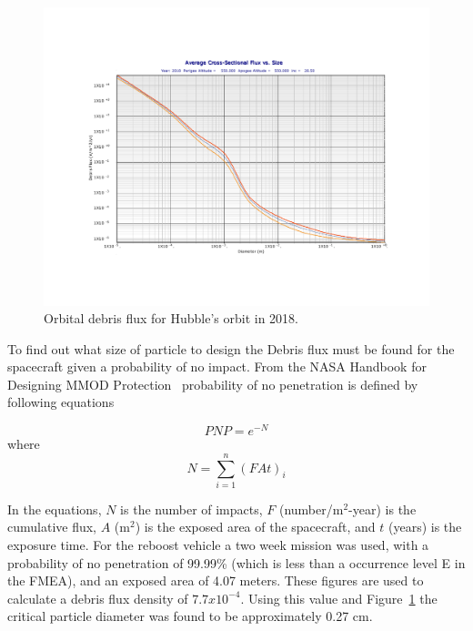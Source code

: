 \documentclass[paper=letter, fontsize=11pt]{scrartcl} %
\numberwithin{equation}{section} %
\numberwithin{figure}{section} %
\numberwithin{table}{section} %
\begin{document}
\begin{figure}[H]
    \begin{center}
        \includegraphics[width=5.5in]{hstOrbit.pdf}
        \caption{Orbital debris flux for Hubble's orbit in 2018.}
        \label{fig:hubbleOrbit}
    \end{center}
\end{figure}

To find out what size of particle to design the Debris flux must be found for the spacecraft given a probability of no impact. From the NASA Handbook for Designing MMOD Protection~\cite{handbook_mmod} probability of no penetration is defined by following equations

\begin{equation*}
    PNP = e^{-N}
\end{equation*}
where
\begin{equation*}
    N = \sum\limits_{i=1}^n (FAt)_i
\end{equation*}

In the equations, $N$ is the number of impacts, $F$ (number/m$^2$-year) is the cumulative flux, $A$ (m$^2$) is the exposed area of the spacecraft, and $t$ (years) is the exposure time. For the reboost vehicle a two week mission was used, with a probability of no penetration of 99.99\% (which is less than a occurrence level E in the FMEA), and an exposed area of 4.07 meters. These figures are used to calculate a debris flux density of $7.7 x 10^{-4}$. Using this value and Figure~\ref{fig:hubbleOrbit} the critical particle diameter was found to be approximately 0.27 cm.
\end{document}
